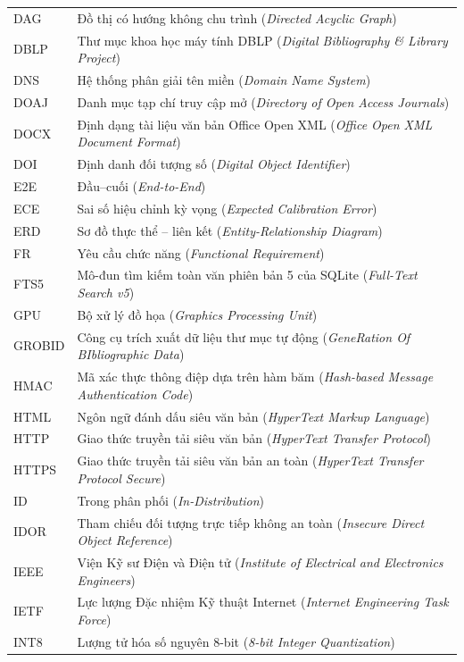 {\begin{longtable}{P{0.22}P{0.78}}
DAG & Đồ thị có hướng không chu trình (\textit{Directed Acyclic Graph}) \\
DBLP & Thư mục khoa học máy tính DBLP (\textit{Digital Bibliography \& Library Project}) \\
DNS & Hệ thống phân giải tên miền (\textit{Domain Name System}) \\
DOAJ & Danh mục tạp chí truy cập mở (\textit{Directory of Open Access Journals}) \\
DOCX & Định dạng tài liệu văn bản Office Open XML (\textit{Office Open XML Document Format}) \\
DOI & Định danh đối tượng số (\textit{Digital Object Identifier}) \\
E2E & Đầu--cuối (\textit{End-to-End}) \\
ECE & Sai số hiệu chỉnh kỳ vọng (\textit{Expected Calibration Error}) \\
ERD & Sơ đồ thực thể -- liên kết (\textit{Entity-Relationship Diagram}) \\
FR & Yêu cầu chức năng (\textit{Functional Requirement}) \\
FTS5 & Mô-đun tìm kiếm toàn văn phiên bản 5 của SQLite (\textit{Full-Text Search v5}) \\
GPU & Bộ xử lý đồ họa (\textit{Graphics Processing Unit}) \\
GROBID & Công cụ trích xuất dữ liệu thư mục tự động (\textit{GeneRation Of BIbliographic Data}) \\
HMAC & Mã xác thực thông điệp dựa trên hàm băm (\textit{Hash-based Message Authentication Code}) \\
HTML & Ngôn ngữ đánh dấu siêu văn bản (\textit{HyperText Markup Language}) \\
HTTP & Giao thức truyền tải siêu văn bản (\textit{HyperText Transfer Protocol}) \\
HTTPS & Giao thức truyền tải siêu văn bản an toàn (\textit{HyperText Transfer Protocol Secure}) \\
ID & Trong phân phối (\textit{In-Distribution}) \\
IDOR & Tham chiếu đối tượng trực tiếp không an toàn (\textit{Insecure Direct Object Reference}) \\
IEEE & Viện Kỹ sư Điện và Điện tử (\textit{Institute of Electrical and Electronics Engineers}) \\
IETF & Lực lượng Đặc nhiệm Kỹ thuật Internet (\textit{Internet Engineering Task Force}) \\
INT8 & Lượng tử hóa số nguyên 8-bit (\textit{8-bit Integer Quantization}) \\

\end{longtable}}
